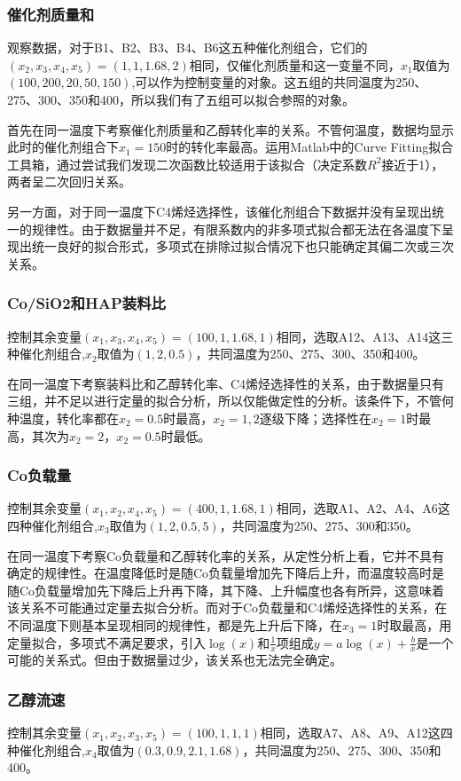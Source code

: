 \documentclass{article}
\begin{document}
	\subsubsection{催化剂质量和}
	观察数据，对于B1、B2、B3、B4、B6这五种催化剂组合，它们的$(x_2,x_3,x_4,x_5)=(1,1,1.68,2)$相同，仅催化剂质量和这一变量不同，$x_1$取值为$(100,200,20,50,150)$,可以作为控制变量的对象。这五组的共同温度为250、275、300、350和400，所以我们有了五组可以拟合参照的对象。
	
	首先在同一温度下考察催化剂质量和乙醇转化率的关系。不管何温度，数据均显示此时的催化剂组合下$x_1=150$时的转化率最高。运用Matlab中的Curve Fitting拟合工具箱，通过尝试我们发现二次函数比较适用于该拟合（决定系数$R^2$接近于1），两者呈二次回归关系。
	
	另一方面，对于同一温度下C4烯烃选择性，该催化剂组合下数据并没有呈现出统一的规律性。由于数据量并不足，有限系数内的非多项式拟合都无法在各温度下呈现出统一良好的拟合形式，多项式在排除过拟合情况下也只能确定其偏二次或三次关系。
	\subsubsection{Co/SiO2和HAP装料比}
	控制其余变量$(x_1,x_3,x_4,x_5)=(100,1,1.68,1)$相同，选取A12、A13、A14这三种催化剂组合,$x_2$取值为$(1,2 ,0.5)$，共同温度为250、275、300、350和400。
	
	在同一温度下考察装料比和乙醇转化率、C4烯烃选择性的关系，由于数据量只有三组，并不足以进行定量的拟合分析，所以仅能做定性的分析。该条件下，不管何种温度，转化率都在$x_2=0.5$时最高，$x_2=1,2$逐级下降；选择性在$x_2=1$时最高，其次为$x_2=2$，$x_2=0.5$时最低。
	\subsubsection{Co负载量}
	控制其余变量$(x_1,x_2,x_4,x_5)=(400,1,1.68,1)$相同，选取A1、A2、A4、A6这四种催化剂组合,$x_3$取值为$(1,2 ,0.5,5)$，共同温度为250、275、300和350。
	
	在同一温度下考察Co负载量和乙醇转化率的关系，从定性分析上看，它并不具有确定的规律性。在温度降低时是随Co负载量增加先下降后上升，而温度较高时是随Co负载量增加先下降后上升再下降，其下降、上升幅度也各有所异，这意味着该关系不可能通过定量去拟合分析。而对于Co负载量和C4烯烃选择性的关系，在不同温度下则基本呈现相同的规律性，都是先上升后下降，在$x_3=1$时取最高，用定量拟合，多项式不满足要求，引入$\log(x)$和$\frac{1}{x}$项组成$y=a\log(x)+\frac{b}{x}$是一个可能的关系式。但由于数据量过少，该关系也无法完全确定。
	\subsubsection{乙醇流速}
	控制其余变量$(x_1,x_2,x_3,x_5)=(100,1,1,1)$相同，选取A7、A8、A9、A12这四种催化剂组合,$x_4$取值为$(0.3,0.9,2.1,1.68)$，共同温度为250、275、300、350和400。
	
\end{document}
